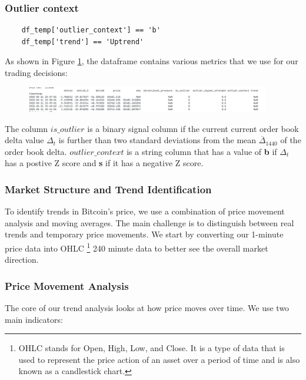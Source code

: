 \documentclass[12pt]{article}
\begin{document}
\subsubsection*{Outlier context}


\begin{verbatim}
    df_temp['outlier_context'] == 'b'
    df_temp['trend'] == 'Uptrend'
\end{verbatim}

As shown in Figure \ref{fig:outlier_context}, the dataframe contains various metrics that we use for our trading decisions:

\begin{figure}[h]
    \centering
    \includegraphics[width=0.95\textwidth]{imgs/dataframeHead.png}
    \caption{}
    \label{fig:outlier_context}
\end{figure}


The column $is\_outlier$ is a binary signal column if the current current order book delta value $\Delta_t$ is further than two standard deviations from the mean $\overline{\Delta}_{1440}$ of the order book delta.
$outlier\_context$ is a string column that has a value of \textbf{b} if $\Delta_t$ has a postive Z score and \textbf{s} if it has a negative Z score.

\subsubsection*{Market Structure and Trend Identification}

To identify trends in Bitcoin's price, we use a combination of price movement analysis and moving averages. The main challenge is to distinguish between real trends and temporary price movements. We start by converting our 1-minute price data into OHLC \footnote{OHLC stands for Open, High, Low, and Close. It is a type of data that is used to represent the price action of an asset over a period of time and is also known as a candlestick chart.} 240 minute data to better see the overall market direction.

\subsubsection*{Price Movement Analysis}
The core of our trend analysis looks at how price moves over time. We use two main indicators:
\end{document}
